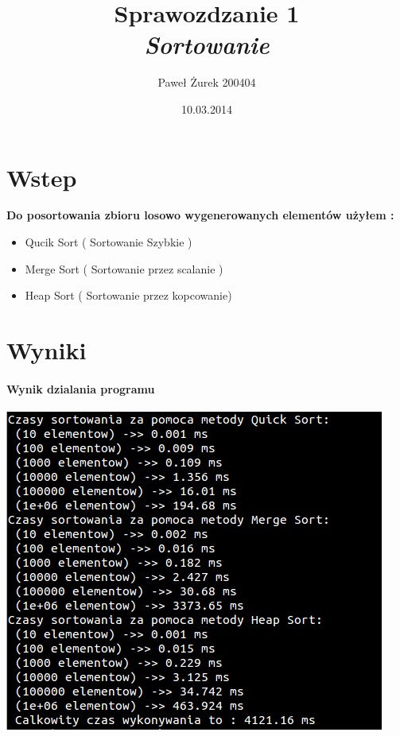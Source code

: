 \documentclass[10 pt]{article}
\title{Sprawozdzanie 1\\ \emph{ \textbf{Sortowanie}}}
\author{Paweł Żurek 200404}
\date{10.03.2014}
\begin{document}
\tableofcontents
\maketitle
\section{Wstep}
\textbf{Do posortowania zbioru losowo wygenerowanych elementów użyłem : }
\begin{itemize}
\item Qucik Sort ( Sortowanie Szybkie )
\item Merge Sort ( Sortowanie przez scalanie )
\item Heap Sort ( Sortowanie przez kopcowanie)
\end{itemize}
\section{Wyniki}

\paragraph{Wynik dzialania programu\\}
\begin{center}
\includegraphics[scale=0.6]{WYKONANIE.png}
\end{center}
\end{document}

